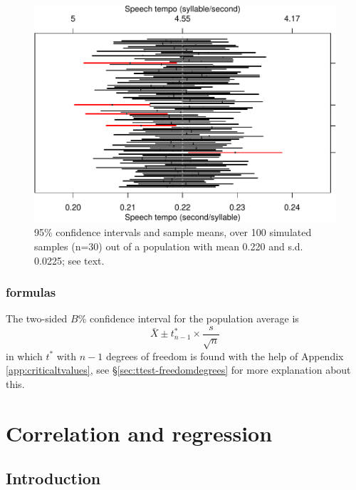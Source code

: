 \documentclass[
]{book}
\begin{document}
\begin{figure}
\centering
\includegraphics{QMS-EN_files/figure-latex/tempo95CIs-1.pdf}
\caption{\label{fig:tempo95CIs}95\% confidence intervals and sample means, over 100 simulated samples (n=30) out of a population with mean 0.220 and s.d. 0.0225; see text.}
\end{figure}

\hypertarget{formulas-2}{%
\subsection{formulas}\label{formulas-2}}

The two-sided \(B\)\% confidence interval for the population
average is
\begin{equation}
  \bar{X} \pm t^*_{n-1} \times \frac{s}{\sqrt{n}}
  \label{eq:t-onesampleCI}
\end{equation}
in which \(t^*\) with \(n-1\) degrees of freedom is found with the help of
Appendix \ref{app:criticaltvalues}, see
§\ref{sec:ttest-freedomdegrees} for more explanation about this.

\hypertarget{ch:correlation-regression}{%
\chapter{Correlation and regression}\label{ch:correlation-regression}}

\hypertarget{introduction-5}{%
\section{Introduction}\label{introduction-5}}
\end{document}
